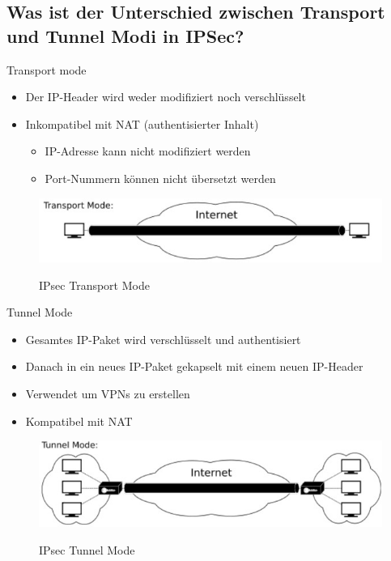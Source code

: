 \subsection*{Was ist der Unterschied zwischen Transport und Tunnel Modi in IPSec?}
Transport mode
\begin{itemize}
    \item Der IP-Header wird weder modifiziert noch verschlüsselt
    \item Inkompatibel mit NAT (authentisierter Inhalt)
    \begin{itemize}
        \item IP-Adresse kann nicht modifiziert werden
        \item Port-Nummern können nicht übersetzt werden
    \end{itemize}
\end{itemize}
\begin{figure}[H]
    \begin{center}
    \label{pic:IPsecTransportMode}
    \includegraphics[width=\textwidth]{images/ipsec_transport_mode.jpg}
    \caption{IPsec Transport Mode}\cite{wiki}
    \end{center}
\end{figure}

Tunnel Mode
\begin{itemize}
    \item Gesamtes IP-Paket wird verschlüsselt und authentisiert
    \item Danach in ein neues IP-Paket gekapselt mit einem neuen IP-Header
    \item Verwendet um VPNs zu erstellen
    \item Kompatibel mit NAT
\end{itemize}
\begin{figure}[H]
    \begin{center}
    \label{pic:IPsecTunnelMode}
    \includegraphics[width=\textwidth]{images/ipsec_tunnel_mode.jpg}
    \caption{IPsec Tunnel Mode}\cite{wiki}
    \end{center}
\end{figure}

